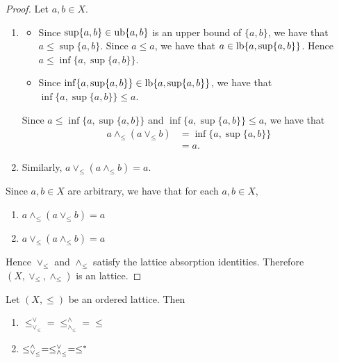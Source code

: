 \documentclass{book}
\begin{document}
	\begin{proof} Let $a,b \in X$. 
		\begin{enumerate}
			\item 
			\begin{itemize}
				\item Since $\sup \{a,b\} \in \operatorname{ub} \{a,b\}$ is an upper bound of $\{a,b\}$, we have that $a \leq \sup \{a,b\}$. Since $a \leq a$, we have that $a \in \operatorname{lb} \{a, \sup\{a, b \} \}$. Hence $a \leq \inf \{a, \sup\{a, b \} \}$. 
				\item Since $\inf \{a, \sup\{a,b\}\} \in \operatorname{lb} \{a, \sup \{a,b\}\}$, we have that $\inf \{a, \sup\{a,b\}\} \leq a$.
			\end{itemize}
			Since $a \leq \inf \{a, \sup\{a, b \} \}$ and $\inf \{a, \sup\{a,b\}\} \leq a$, we have that 
			\begin{align*}
				a \wedge_{\leq} (a \vee_{\leq} b)
				& = \inf \{a, \sup\{a, b \} \} \\
				& = a.
			\end{align*}
			\item Similarly, $a \vee_{\leq} (a \wedge_{\leq} b) = a$.
		\end{enumerate}
		Since $a, b \in X$ are arbitrary, we have that for each $a,b \in X$, 
		\begin{enumerate}
			\item $a \wedge_{\leq} (a \vee_{\leq} b) = a$
			\item $a \vee_{\leq} (a \wedge_{\leq} b) = a$
		\end{enumerate} 
		Hence $\vee_{\leq}$ and $\wedge_{\leq}$ satisfy the lattice absorption identities. Therefore $(X, \vee_{\leq}, \wedge_{\leq})$ is an lattice.
	\end{proof}
	
	\begin{ex} 
		Let $(X, \leq)$ be an ordered lattice. Then
		\begin{enumerate}
			\item $\leq_{\vee_{\leq}}^{\vee} = \leq_{\wedge_{\leq}}^{\wedge} = \leq$
			\item $\leq_{\vee_{\leq}}^{\wedge} = \leq_{\wedge_{\leq}}^{\vee} = \leq^*$
		\end{enumerate}
	\end{ex}
	
\end{document}
